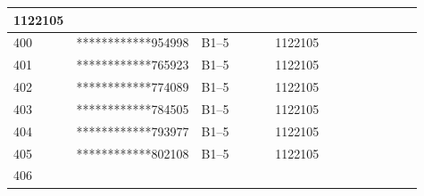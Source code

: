 \documentclass[UTF8,10pt,a4paper,fontset=fandol]{ctexart}
\newcommand{\fieldvalue}[1]{#1}
\begin{document}
\begin{center}
\begin{tabular}{|p{0.08\linewidth}|p{0.29\linewidth}|p{0.18\linewidth}|p{0.18\linewidth}|p{0.18\linewidth}|}
\fieldvalue{1122105}
& \\ \hline
\fieldvalue{400}
&
\fieldvalue{************954998}
&
\fieldvalue{B1--5}
&
\fieldvalue{1122105}
& \\ \hline
\fieldvalue{401}
&
\fieldvalue{************765923}
&
\fieldvalue{B1--5}
&
\fieldvalue{1122105}
& \\ \hline
\fieldvalue{402}
&
\fieldvalue{************774089}
&
\fieldvalue{B1--5}
&
\fieldvalue{1122105}
& \\ \hline
\fieldvalue{403}
&
\fieldvalue{************784505}
&
\fieldvalue{B1--5}
&
\fieldvalue{1122105}
& \\ \hline
\fieldvalue{404}
&
\fieldvalue{************793977}
&
\fieldvalue{B1--5}
&
\fieldvalue{1122105}
& \\ \hline
\fieldvalue{405}
&
\fieldvalue{************802108}
&
\fieldvalue{B1--5}
&
\fieldvalue{1122105}
& \\ \hline
\fieldvalue{406}

\end{tabular}
\end{center}
\end{document}
